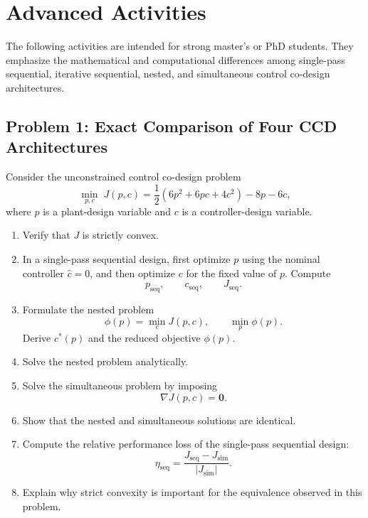 
\section{Advanced Activities}

The following activities are intended for strong master's or PhD students.
They emphasize the mathematical and computational differences among
single-pass sequential, iterative sequential, nested, and simultaneous
control co-design architectures.

\subsection*{Problem 1: Exact Comparison of Four CCD Architectures}

Consider the unconstrained control co-design problem
\begin{equation}
\min_{p,c}\;
J(p,c)
=
\frac{1}{2}
\left(
6p^2+6pc+4c^2
\right)
-8p-6c,
\end{equation}
where $p$ is a plant-design variable and $c$ is a controller-design
variable.

\begin{enumerate}
    \item Verify that $J$ is strictly convex.

    \item In a single-pass sequential design, first optimize $p$ using the
    nominal controller $\hat{c}=0$, and then optimize $c$ for the fixed
    value of $p$. Compute
    \begin{equation}
    p_{\mathrm{seq}},
    \qquad
    c_{\mathrm{seq}},
    \qquad
    J_{\mathrm{seq}}.
    \end{equation}

    \item Formulate the nested problem
    \begin{equation}
    \phi(p)=\min_c J(p,c),
    \qquad
    \min_p \phi(p).
    \end{equation}
    Derive $c^*(p)$ and the reduced objective $\phi(p)$.

    \item Solve the nested problem analytically.

    \item Solve the simultaneous problem by imposing
    \begin{equation}
    \nabla J(p,c)=\mathbf{0}.
    \end{equation}

    \item Show that the nested and simultaneous solutions are identical.

    \item Compute the relative performance loss of the single-pass
    sequential design:
    \begin{equation}
    \eta_{\mathrm{seq}}
    =
    \frac{J_{\mathrm{seq}}-J_{\mathrm{sim}}}
    {|J_{\mathrm{sim}}|}.
    \end{equation}

    \item Explain why strict convexity is important for the equivalence
    observed in this problem.
\end{enumerate}


